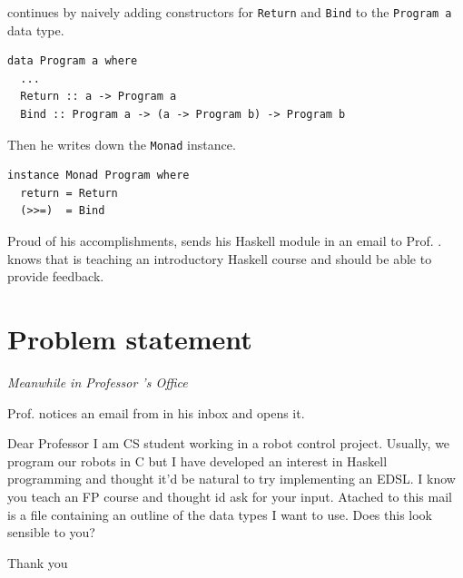 \studname{} continues by naively adding constructors for {\tt Return} and 
{\tt Bind} to the {\tt Program a} data type.   

\begin{small} 
\begin{verbatim}
data Program a where 
  ...
  Return :: a -> Program a 
  Bind :: Program a -> (a -> Program b) -> Program b 
\end{verbatim} 
\end{small} 

Then he writes down the {\tt Monad} instance.
 
\begin{small} 
\begin{verbatim}
instance Monad Program where 
  return = Return 
  (>>=)  = Bind 
\end{verbatim} 
\end{small} 

Proud of his accomplishments, \studname{} sends his Haskell module in an email to Prof. \docname{}.
\studname{} knows that \docname{} is teaching an introductory Haskell course and should be 
able to provide feedback.



\section{Problem statement} 
\emph{Meanwhile in Professor \docname{}'s Office}\newline \newline

\noindent Prof. \docname{} notices an email from \studname{} in his inbox and opens it. 

\vspace{5mm} 

\noindent\colorbox{light-gray}{
\begin{minipage}[]{0.9\linewidth}
\noindent 
Dear Professor \docname{}
\newline \newline
\noindent I am CS student working in a robot control project. Usually, we 
program our robots in C but I have developed an interest in Haskell 
programming and thought it'd be natural to try implementing an EDSL. 
I know you teach an FP course and thought id ask for your input. 
Atached to this mail is a file containing an outline of the data types I 
want to use. Does this look sensible to you? \newline \newline

\noindent Thank you \newline
\noindent \studname{}
\end{minipage} 
}

